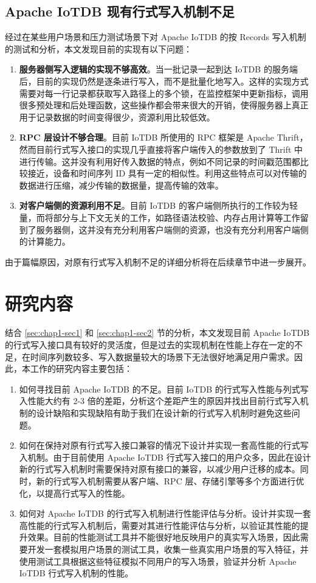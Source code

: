 \subsection{Apache IoTDB 现有行式写入机制不足}
经过在某些用户场景和压力测试场景下对 Apache IoTDB 的按 Records 写入机制的测试和分析，本文发现目前的实现有以下问题：
\begin{enumerate}
  \item \textbf{服务器侧写入逻辑的实现不够高效}。当一批记录一起到达 IoTDB 的服务端后，目前的实现仍然是逐条进行写入，而不是批量化地写入。这样的实现方式需要对每一行记录都获取写入路径上的多个锁，在监控框架中更新指标，调用很多预处理和后处理函数，这些操作都会带来很大的开销，使得服务器上真正用于记录数据的时间变得很少，资源利用比较低效。
  \item \textbf{RPC 层设计不够合理}。目前 IoTDB 所使用的 RPC 框架是 Apache Thrift，然而目前行式写入接口的实现几乎直接将客户端传入的参数放到了 Thrift 中进行传输。这并没有利用好传入数据的特点，例如不同记录的时间戳范围都比较接近，设备和时间序列 ID 具有一定的相似性。利用这些特点可以对传输的数据进行压缩，减少传输的数据量，提高传输的效率。
  \item \textbf{对客户端侧的资源利用不足}。目前 IoTDB 的客户端侧所执行的工作较为轻量，而将部分与上下文无关的工作，如路径语法校验、内存占用计算等工作留到了服务器侧，这并没有充分利用客户端侧的资源，也没有充分利用客户端侧的计算能力。
\end{enumerate}
由于篇幅原因，对原有行式写入机制不足的详细分析将在后续章节中进一步展开。
\section{研究内容}
结合 \ref{sec:chap1-sec1} 和 \ref{sec:chap1-sec2} 节的分析，本文发现目前 Apache IoTDB 的行式写入接口具有较好的灵活度，但是过去的实现机制在性能上存在一定的不足，在时间序列数较多、写入数据量较大的场景下无法很好地满足用户需求。因此，本工作的研究内容主要包括：
\begin{enumerate}
  \item 如何寻找目前 Apache IoTDB 的不足。目前 IoTDB 的行式写入性能与列式写入性能大约有 2-3 倍的差距，分析这个差距产生的原因并找出目前行式写入机制的设计缺陷和实现缺陷有助于我们在设计新的行式写入机制时避免这些问题。
  \item 如何在保持对原有行式写入接口兼容的情况下设计并实现一套高性能的行式写入机制。由于目前使用 Apache IoTDB 行式写入接口的用户众多，因此在设计新的行式写入机制时需要保持对原有接口的兼容，以减少用户迁移的成本。同时，新的行式写入机制需要从客户端、RPC 层、存储引擎等多个方面进行优化，以提高行式写入的性能。
  \item 如何对 Apache IoTDB 的行式写入机制进行性能评估与分析。设计并实现一套高性能的行式写入机制后，需要对其进行性能评估与分析，以验证其性能的提升效果。目前的性能测试工具并不能很好地反映用户的真实写入场景，因此需要开发一套模拟用户场景的测试工具，收集一些真实用户场景的写入特征，并使用测试工具根据这些特征模拟不同用户的写入场景，验证并分析 Apache IoTDB 行式写入机制的性能。
\end{enumerate}

